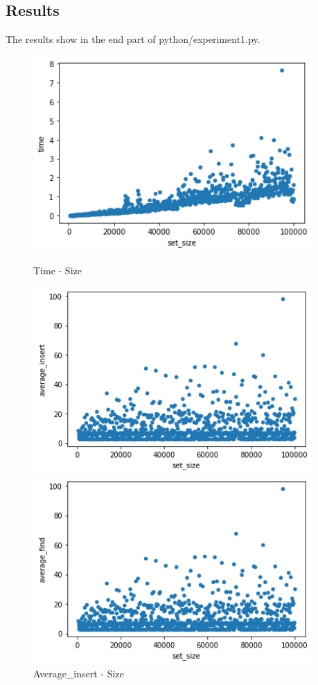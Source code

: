 \documentclass[a4]{article}
\begin{document}
\subsection{Results}
The results show in the end part of python/experiment1.py.
\begin{figure}[H]
    \begin{minipage}{0.5\textwidth}        
    \includegraphics[width=0.95\textwidth]{hashset1.png}
    \caption{Time - Size}
    \end{minipage}
    \begin{minipage}{0.5\textwidth}        
    \includegraphics[width=0.95\textwidth]{hashset2.png}
    \caption{Average\_insert - Size}
    \end{minipage}
    \begin{minipage}{0.5\textwidth}        
    \includegraphics[width=0.95\textwidth]{hashset3.png}

\end{minipage}
\end{figure}
\end{document}

